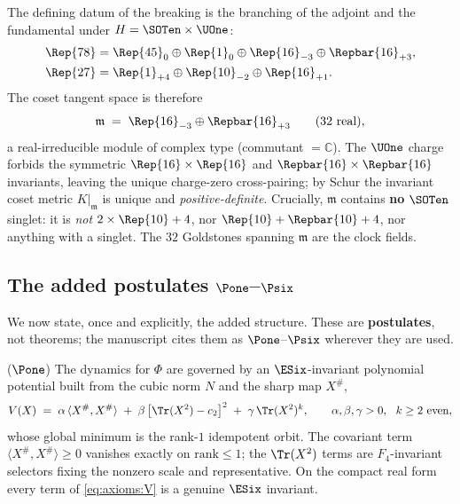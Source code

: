 The defining datum of the breaking is the branching of the adjoint and the
fundamental under $H=\SOTen\times\UOne$:
\begin{align}
  \Rep{78} &= \Rep{45}_{0}\oplus\Rep{1}_{0}
              \oplus\Rep{16}_{-3}\oplus\Repbar{16}_{+3}, \label{eq:axioms:adj}\\
  \Rep{27} &= \Rep{1}_{+4}\oplus\Rep{10}_{-2}\oplus\Rep{16}_{+1}.
              \label{eq:axioms:fund}
\end{align}
The coset tangent space is therefore
\begin{equation}\label{eq:axioms:tangent}
  \mathfrak m \;=\; \Rep{16}_{-3}\oplus\Repbar{16}_{+3}
  \qquad (32\ \text{real}),
\end{equation}
a real-irreducible module of complex type (commutant $=\mathbb C$). The
$\UOne$ charge forbids the symmetric $\Rep{16}\times\Rep{16}$ and
$\Repbar{16}\times\Repbar{16}$ invariants, leaving the unique charge-zero
cross-pairing; by Schur the invariant coset metric $K|_{\mathfrak m}$ is
unique and \emph{positive-definite}. Crucially, $\mathfrak m$ contains
\textbf{no} $\SOTen$ singlet: it is \emph{not} $2\times\Rep{10}+4$, nor
$\Rep{10}+\Repbar{10}+4$, nor anything with a singlet. The $32$ Goldstones
spanning $\mathfrak m$ are the clock fields.

\subsection{The added postulates \texorpdfstring{$\Pone$--$\Psix$}{P1--P6}}
\label{sec:axioms:postulates}

We now state, once and explicitly, the added structure. These are
\textbf{postulates}, not theorems; the manuscript cites them as
$\Pone$--$\Psix$ wherever they are used.

\begin{postulate}\label{post:axioms:P1}
($\Pone$) The dynamics for $\Phi$ are governed by an $\ESix$-invariant
polynomial potential built from the cubic norm $N$ and the sharp map
$X^{\#}$,
\begin{equation}\label{eq:axioms:V}
  V(X)\;=\;\alpha\,\langle X^{\#},X^{\#}\rangle
          \;+\;\beta\,\bigl[\Tr(X^2)-c_2\bigr]^2
          \;+\;\gamma\,\Tr(X^2)^{k},
  \qquad \alpha,\beta,\gamma>0,\ \ k\ge2\ \text{even},
\end{equation}
whose global minimum is the rank-$1$ idempotent orbit. The covariant term
$\langle X^{\#},X^{\#}\rangle\ge0$ vanishes exactly on $\mathrm{rank}\le1$;
the $\Tr(X^2)$ terms are $F_4$-invariant selectors fixing the nonzero scale
and representative. On the compact real form every term of
\eqref{eq:axioms:V} is a genuine $\ESix$ invariant.
\end{postulate}

